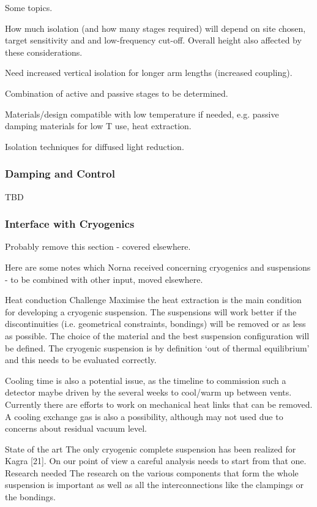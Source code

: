 Some topics.

How much isolation (and how many stages required) will depend on site chosen, target sensitivity and and low-frequency cut-off. Overall height also affected by these considerations.

Need increased vertical isolation for longer arm lengths (increased coupling).

Combination of active and passive stages to be determined.

Materials/design compatible with low temperature if needed, e.g. passive damping materials for low T use, heat extraction.   

Isolation techniques for diffused light reduction.       



\subsubsection{Damping and Control}

TBD


\subsubsection{Interface with Cryogenics}

Probably remove this section - covered elsewhere.

Here are some notes which Norna received concerning cryogenics and suspensions - to be combined with other input, moved elsewhere.

Heat conduction
Challenge
Maximise the heat extraction is the main condition for developing a cryogenic suspension. The suspensions will work better if the discontinuities (i.e. geometrical constraints, bondings) will be removed or as less as possible. The choice of the material and the best suspension configuration will be defined. The cryogenic suspension is by definition ‘out of thermal equilibrium’ and this needs to be evaluated correctly.

Cooling time is also a potential issue, as the timeline to commission such a detector maybe driven by the several weeks to cool/warm up between vents. Currently there are efforts to work on mechanical heat links that can be removed. A cooling exchange gas is also a possibility, although may not used due to concerns about residual vacuum level.

State of the art
The only cryogenic complete suspension has been realized for Kagra [21]. On our point of view a careful analysis needs to start from that one.
Research needed
The research on the various components that form the whole suspension is important as well as all the interconnections like the clampings or the bondings. 


